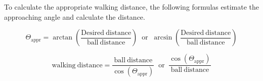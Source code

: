 To calculate the appropriate walking distance, the following formulas estimate the approaching angle and calculate the distance.

\begin{equation}
\Theta_\mathrm{appr}=\arctan\left(\frac{\mathrm{Desired\ distance}}{\mathrm{ball\ distance}} \right) \; \; \mathrm{or} \; \; \arcsin\left(\frac{\mathrm{Desired\ distance}}{\mathrm{ball\ distance}}\right)
\end{equation}

\begin{equation}
	\mathrm{walking\ distance}=\frac{\mathrm{ball\ distance}}{\cos(\Theta_\mathrm{appr})} \; \; \mathrm{or} \; \; \frac{\cos(\Theta_\mathrm{appr})}{\mathrm{ball\ distance}}
\end{equation}

       